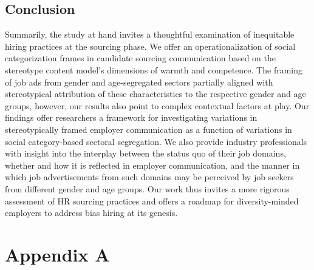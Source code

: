 \documentclass[jou]{apa7}
\begin{document}
\subsection{Conclusion}
\label{conclusion}
Summarily, the study at hand invites a thoughtful examination of inequitable hiring practices at the sourcing phase. We offer an operationalization of social categorization frames in candidate sourcing communication based on the stereotype content model’s dimensions of warmth and competence. The framing of job ads from gender and age-segregated sectors partially aligned with stereotypical attribution of these characteristics to the respective gender and age groups, however, our results also point to complex contextual factors at play. Our findings offer researchers a framework for investigating variations in stereotypically framed employer communication as a function of variations in social category-based sectoral segregation. We also provide industry professionals with insight into the interplay between the status quo of their job domains, whether and how it is reflected in employer communication, and the manner in which job advertisements from such domains may be perceived by job seekers from different gender and age groups. Our work thus invites a more rigorous assessment of HR sourcing practices and offers a roadmap for diversity-minded employers to address bias hiring at its genesis.

\printbibliography

\newpage
\section{Appendix A}
\label{appendix_a}
\end{document}
